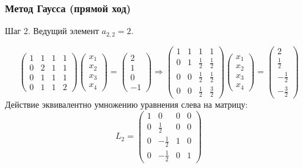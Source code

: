 \documentclass[10pt]{beamer}
\begin{document}
\begin{frame}[fragile]
\frametitle{Метод Гаусса (прямой ход)}

Шаг 2. Ведущий элемент $a_{2,2} = 2$. 

$$
\begin{pmatrix}
1 & 1 & 1 & 1 \\
0 & 2 & 1 & 1 \\
0 & 1 & 1 & 1 \\
0 & 1 & 1 & 2 
\end{pmatrix}
\begin{pmatrix}
x_1 \\
x_2 \\
x_3 \\
x_4
\end{pmatrix}
=
\begin{pmatrix}
2 \\
1 \\
0 \\
-1
\end{pmatrix}
\Rightarrow
\begin{pmatrix}
1 & 1 & 1 & 1 \\
0 & 1 & \frac{1}{2} & \frac{1}{2} \\
0 & 0 & \frac{1}{2} & \frac{1}{2} \\
0 & 0 & \frac{1}{2} & \frac{3}{2} 
\end{pmatrix}
\begin{pmatrix}
x_1 \\
x_2 \\
x_3 \\
x_4
\end{pmatrix}
=
\begin{pmatrix}
2 \\
\frac{1}{2} \\
-\frac{1}{2} \\
-\frac{3}{2}
\end{pmatrix}
$$
Действие эквивалентно умножению уравнения слева на матрицу:
$$
L_2 = 
\begin{pmatrix}
1 & 0 & 0 & 0 \\
0 & \frac{1}{2} & 0 & 0 \\
0 & -\frac12 & 1 & 0 \\
0 & -\frac12 & 0 & 1 
\end{pmatrix}
$$

\end{frame}
\end{document}
